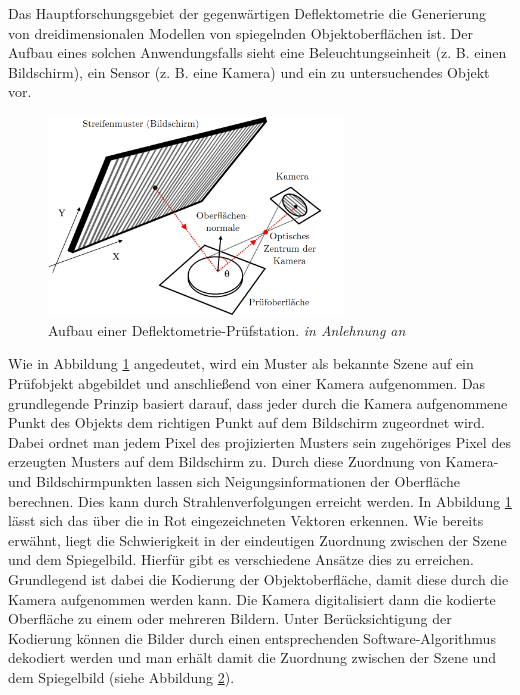 Das Hauptforschungsgebiet der gegenwärtigen Deflektometrie die Generierung von dreidimensionalen Modellen von spiegelnden Objektoberflächen ist.
Der Aufbau eines solchen Anwendungsfalls sieht eine Beleuchtungseinheit (z. B. einen Bildschirm), ein Sensor (z. B. eine Kamera) und ein zu untersuchendes Objekt vor.

\begin{figure}[H]
	\centering
	\includegraphics[width=0.7\textwidth]{02_grundlagenDerDeflektometrie/rekonstruktion/figures/nature-articel-nr1}
	\caption[Aufbau einer Deflektometrie-Prüfstation]{Aufbau einer Deflektometrie-Prüfstation. \textit{in Anlehnung an} \cite{aufbau}}
	\label{img:aufbau}
\end{figure}

\noindent
Wie in Abbildung \ref{img:aufbau} angedeutet, wird ein Muster als bekannte Szene auf ein Prüfobjekt abgebildet und anschließend von einer Kamera aufgenommen.
Das grundlegende Prinzip basiert darauf, dass jeder durch die Kamera aufgenommene Punkt des Objekts dem richtigen Punkt auf dem Bildschirm zugeordnet wird.
Dabei ordnet man jedem Pixel des projizierten Musters sein zugehöriges Pixel des erzeugten Musters auf dem Bildschirm zu.
Durch diese Zuordnung von Kamera- und Bildschirmpunkten lassen sich Neigungsinformationen der Oberfläche berechnen.
Dies kann durch Strahlenverfolgungen erreicht werden.
In Abbildung \ref{img:aufbau} lässt sich das über die in Rot eingezeichneten Vektoren erkennen.
Wie bereits erwähnt, liegt die Schwierigkeit in der eindeutigen Zuordnung zwischen der Szene und dem Spiegelbild.
Hierfür gibt es verschiedene Ansätze dies zu erreichen.
Grundlegend ist dabei die Kodierung der Objektoberfläche, damit diese durch die Kamera aufgenommen werden kann.
Die Kamera digitalisiert dann die kodierte Oberfläche zu einem oder mehreren Bildern.
Unter Berücksichtigung der Kodierung können die Bilder durch einen entsprechenden Software-Algorithmus dekodiert werden und man erhält damit die Zuordnung zwischen der Szene und dem Spiegelbild (siehe Abbildung \ref{tikz:abbKodierungUndDekodierung}).
%
{
	\begin{figure}[H]
		\centering
		
		\label{tikz:abbKodierungUndDekodierung}
	\end{figure}
}

